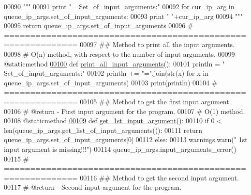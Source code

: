 \begin{DoxyCode}
00090         \textcolor{stringliteral}{"""}
00091 \textcolor{stringliteral}{        print "=    Set\_of\_input\_arguments:"}
00092 \textcolor{stringliteral}{        for cur\_ip\_arg in queue\_ip\_args.set\_of\_input\_arguments:}
00093 \textcolor{stringliteral}{            print " "+cur\_ip\_arg}
00094 \textcolor{stringliteral}{        """}
00095         \textcolor{keywordflow}{return} queue\_ip\_args.set\_of\_input\_arguments
00096     \textcolor{comment}{# ============================================================}
00097     \textcolor{comment}{##  Method to print all the input arguments.}
00098     \textcolor{comment}{#   O(n) method, with respect to the number of input arguments.}
00099     @staticmethod
\hypertarget{queue__ip__arguments_8py_source_l00100}{}\hyperlink{classutilities_1_1queue__ip__arguments_1_1queue__ip__args_a85480b443e2538123e8531852f9035c9}{00100}     \textcolor{keyword}{def }\hyperlink{classutilities_1_1queue__ip__arguments_1_1queue__ip__args_a85480b443e2538123e8531852f9035c9}{print\_all\_input\_arguments}():
00101         println = \textcolor{stringliteral}{"~    Set\_of\_input\_arguments:"}
00102         println += \textcolor{stringliteral}{"="}.join(str(x) \textcolor{keywordflow}{for} x \textcolor{keywordflow}{in} queue\_ip\_args.set\_of\_input\_arguments)
00103         print(println)
00104     \textcolor{comment}{# ============================================================}
00105     \textcolor{comment}{##  Method to get the first input argument.}
00106     \textcolor{comment}{#   @return - First input argument for the program.}
00107     \textcolor{comment}{#   O(1) method.}
00108     @staticmethod
\hypertarget{queue__ip__arguments_8py_source_l00109}{}\hyperlink{classutilities_1_1queue__ip__arguments_1_1queue__ip__args_a7b3c5efad539fadfb53eda0cfb8d3f03}{00109}     \textcolor{keyword}{def }\hyperlink{classutilities_1_1queue__ip__arguments_1_1queue__ip__args_a7b3c5efad539fadfb53eda0cfb8d3f03}{get\_1st\_input\_argument}():
00110         \textcolor{keywordflow}{if} 0 < len(queue\_ip\_args.get\_list\_of\_input\_arguments()):
00111             \textcolor{keywordflow}{return} queue\_ip\_args.set\_of\_input\_arguments[0]
00112         \textcolor{keywordflow}{else}:
00113             warnings.warn(\textcolor{stringliteral}{" 1st input argument is missing!!!"})
00114             queue\_ip\_args.input\_arguments\_error()
00115     \textcolor{comment}{# ============================================================}
00116     \textcolor{comment}{##  Method to get the second input argument.}
00117     \textcolor{comment}{#   @return - Second input argument for the program.}

\end{DoxyCode}
